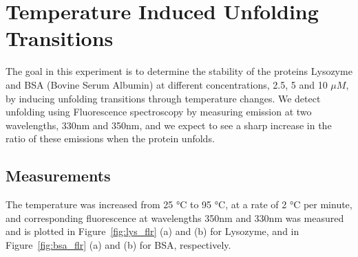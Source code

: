 \documentclass[a4paper,10pt]{article}
\begin{document}
    \section{Temperature Induced Unfolding Transitions}
        The goal in this experiment is to determine the stability of the proteins Lysozyme and BSA 
        (Bovine Serum Albumin) at different concentrations, 2.5, 5 and 10 $\mu M$, by inducing unfolding 
        transitions through temperature changes.
        We detect unfolding using Fluorescence spectroscopy by measuring emission at 
        two wavelengths, 330nm and 350nm, and we expect to see a sharp increase in the ratio
        of these emissions when the protein unfolds.

        \subsection*{Measurements}
            The temperature was increased from 25 °C to 95 °C, at a rate of 2 °C per minute,
            and corresponding fluorescence at wavelengths 350nm and 330nm was measured and 
            is plotted in Figure~\ref{fig:lys_flr} (a) and (b) for Lysozyme, and in 
            Figure~\ref{fig:bsa_flr} (a) and (b) for BSA, respectively.
\end{document}
